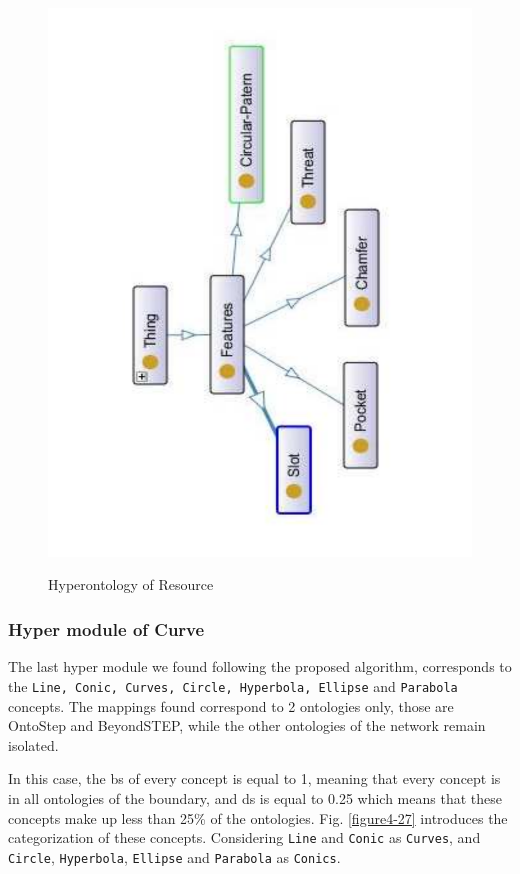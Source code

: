 \begin{figure}
\begin{minipage}{.5\textwidth}
		\includegraphics[scale=0.35, angle=270]{figure-chapterIV/fig4-23}\\
		\caption{Hyperontology of Resource}
		\label{figure4-25}
	\end{minipage}%
\end{figure}


\subsubsection{Hyper module of Curve}\label{subsubsection4.2.5.5}


The last hyper module we found following the proposed algorithm, corresponds to the  \texttt{Line, Conic, Curves, Circle, Hyperbola, Ellipse} and \texttt{Parabola} concepts. The mappings found correspond to 2 ontologies only, those are OntoStep and BeyondSTEP, while the other ontologies of the network remain isolated. 

In this case, the \gls{bs} of every concept is equal to 1, meaning that every concept is in all ontologies of the boundary, and  \gls{ds} is equal to 0.25 which means that these concepts make up less than 25\% of the ontologies. Fig. \ref{figure4-27} introduces the categorization of these concepts. Considering \texttt{Line} and \texttt{Conic} as \texttt{Curves}, and \texttt{Circle}, \texttt{Hyperbola}, \texttt{Ellipse} and \texttt{Parabola} as \texttt{Conics}. 


